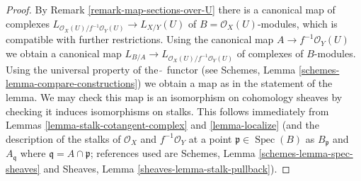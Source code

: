 \documentclass[10pt,a4paper]{amsart}
\theoremstyle{plain}
\theoremstyle{definition}
\theoremstyle{remark}
\numberwithin{equation}{subsection}
\def\Spec{\mathop{\mathrm{Spec}}}
\begin{document}
\begin{proof}
By Remark \ref{remark-map-sections-over-U}
there is a canonical map of complexes
$L_{\mathcal{O}_X(U)/f^{-1}\mathcal{O}_Y(U)} \to L_{X/Y}(U)$
of $B = \mathcal{O}_X(U)$-modules, which is compatible
with further restrictions. Using the canonical map
$A \to f^{-1}\mathcal{O}_Y(U)$ we obtain a canonical map
$L_{B/A} \to L_{\mathcal{O}_X(U)/f^{-1}\mathcal{O}_Y(U)}$
of complexes of $B$-modules.
Using the universal property of the $\widetilde{\ }$
functor (see Schemes, Lemma \ref{schemes-lemma-compare-constructions})
we obtain a map as in the statement of the lemma.
We may check this map is an isomorphism on cohomology sheaves
by checking it induces isomorphisms on stalks.
This follows immediately from
Lemmas \ref{lemma-stalk-cotangent-complex} and \ref{lemma-localize}
(and the description of the stalks of
$\mathcal{O}_X$ and $f^{-1}\mathcal{O}_Y$
at a point $\mathfrak p \in \Spec(B)$ as $B_\mathfrak p$ and
$A_\mathfrak q$ where $\mathfrak q = A \cap \mathfrak p$; references
used are Schemes, Lemma \ref{schemes-lemma-spec-sheaves}
and
Sheaves, Lemma \ref{sheaves-lemma-stalk-pullback}).
\end{proof}
\end{document}

